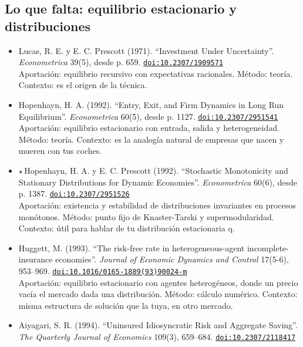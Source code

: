 \documentclass[11pt]{article}
\begin{document}
\subsection*{Lo que falta: equilibrio estacionario y distribuciones}
\begin{itemize}
\item Lucas, R. E. y E. C. Prescott (1971). ``Investment Under Uncertainty''. \textit{Econometrica} 39(5), desde p. 659. \href{https://doi.org/10.2307/1909571}{\texttt{doi:10.2307/1909571}}\\
Aportación: equilibrio recursivo con expectativas racionales. Método: teoría. Contexto: es el origen de la técnica.
\item Hopenhayn, H. A. (1992). ``Entry, Exit, and Firm Dynamics in Long Run Equilibrium''. \textit{Econometrica} 60(5), desde p. 1127. \href{https://doi.org/10.2307/2951541}{\texttt{doi:10.2307/2951541}}\\
Aportación: equilibrio estacionario con entrada, salida y heterogeneidad. Método: teoría. Contexto: es la analogía natural de empresas que nacen y mueren con tus coches.
\item $\star$\,Hopenhayn, H. A. y E. C. Prescott (1992). ``Stochastic Monotonicity and Stationary Distributions for Dynamic Economies''. \textit{Econometrica} 60(6), desde p. 1387. \href{https://doi.org/10.2307/2951526}{\texttt{doi:10.2307/2951526}}\\
Aportación: existencia y estabilidad de distribuciones invariantes en procesos monótonos. Método: punto fijo de Knaster-Tarski y supermodularidad. Contexto: útil para hablar de tu distribución estacionaria q.
\item Huggett, M. (1993). ``The risk-free rate in heterogeneous-agent incomplete-insurance economies''. \textit{Journal of Economic Dynamics and Control} 17(5-6), 953--969. \href{https://doi.org/10.1016/0165-1889(93)90024-m}{\texttt{doi:10.1016/0165-1889(93)90024-m}}\\
Aportación: equilibrio estacionario con agentes heterogéneos, donde un precio vacía el mercado dada una distribución. Método: cálculo numérico. Contexto: misma estructura de solución que la tuya, en otro mercado.
\item Aiyagari, S. R. (1994). ``Uninsured Idiosyncratic Risk and Aggregate Saving''. \textit{The Quarterly Journal of Economics} 109(3), 659--684. \href{https://doi.org/10.2307/2118417}{\texttt{doi:10.2307/2118417}}\\

\end{itemize}
\end{document}
